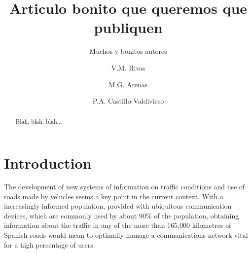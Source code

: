 \documentclass[preprint,authoryear,12pt]{elsarticle}
\begin{document}
\begin{frontmatter}



\title{Articulo bonito que queremos que publiquen}

\author{Muchos y bonitos autores}
\author[uja]{V.M. Rivas}
\author[ugr]{M.G. Arenas}
\author[ugr]{P.A. Castillo-Valdivieso}
\address[uja]{Department of Computer Sciences, University of Jaen (Spain)}
\address[ugr]{Department of Architecture and Computer Technology. CITIC. University of Granada (Spain)}


\address{}

\begin{abstract}
Blah, blah, blah...
\end{abstract}

\begin{keyword}


\end{keyword}

\end{frontmatter}


\section{Introduction}
\label{sec:introduction}
The development of new systems of information on traffic conditions and use of roads made by vehicles seems a key point in the current context. 
With a increasingly informed population, provided with ubiquitous communication devices, which are commonly used by about $ 90 \% $ of the population, obtaining information about the traffic in any of the more than 165,000 kilometres of Spanish roads would mean to optimally manage a communications network vital for a high percentage of users.
\end{document}
